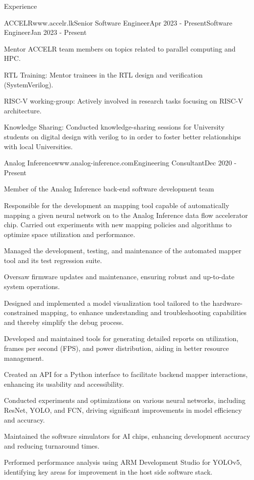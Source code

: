 \documentclass[
	11pt, %
]{./assets/resume} %
\begin{document}
\begin{rSection}{Experience}

	\begin{rSubsectionM}{ACCELR}{www.accelr.lk}{Senior Software Engineer}{Apr 2023 - Present}{Software Engineer}{Jan 2023 - Present}{}{}
        \item Mentor ACCELR team members on topics related to parallel computing and HPC.
        \item RTL Training: Mentor trainees in the RTL design and verification (SystemVerilog).
        \item RISC-V working-group: Actively involved in research tasks focusing on RISC-V architecture.
		\item Knowledge Sharing: Conducted knowledge-sharing sessions for University students on digital design with verilog to in order to foster better relationships with local Universities.
	\end{rSubsectionM}

	\begin{rSubsectionX}{Analog Inference}{www.analog-inference.com}{Engineering Consultant}{Dec 2020 - Present}
		\item Member of the Analog Inference back-end software development team
		\item Responsible for the development an mapping tool capable of automatically mapping a given neural network on to the Analog Inference data flow accelerator chip. Carried out experiments with new mapping policies and algorithms to optimize space utilization and performance.
		\item Managed the development, testing, and maintenance of the automated mapper tool and its test regression suite.
		\item Oversaw firmware updates and maintenance, ensuring robust and up-to-date system operations.
		\item Designed and implemented a model visualization tool tailored to the hardware-constrained mapping, to enhance understanding and troubleshooting capabilities and thereby simplify the debug process.
		\item Developed and maintained tools for generating detailed reports on utilization, frames per second (FPS), and power distribution, aiding in better resource management.
		\item Created an API for a Python interface to facilitate backend mapper interactions, enhancing its usability and accessibility.
		\item Conducted experiments and optimizations on various neural networks, including ResNet, YOLO, and FCN, driving significant improvements in model efficiency and accuracy.
		\item Maintained the software simulators for AI chips, enhancing development accuracy and reducing turnaround times.
		\item Performed performance analysis using ARM Development Studio for YOLOv5, identifying key areas for improvement in the host side software stack.
	\end{rSubsectionX}


\end{rSection}
\end{document}
